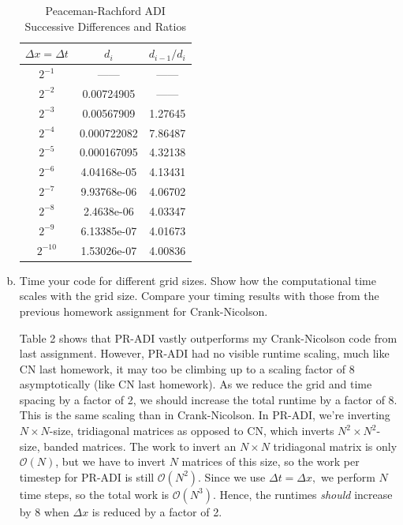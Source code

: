 \documentclass[12pt]{article}
\begin{document}
\begin{enumerate}[(a)]
\begin{table}[H]
\caption{Peaceman-Rachford ADI Successive Differences and Ratios}
\centering\begin{tabular}{||c|cc||}
\hline \hline
   $\Delta x = \Delta t$ &  $d_i$ &   $d_{i-1}/d_{i}$ \\
\hline \hline
                $2^{-1}$      &            ------       &        ------   \\
                $2^{-2}$    &              0.00724905  &       ------   \\
                $2^{-3}$    &     0.00567909  &             1.27645 \\
                $2^{-4}$     &         0.000722082 &    7.86487 \\
                $2^{-5}$      &       0.000167095 &             4.32138 \\
                $2^{-6}$       &       4.04168e-05 &             4.13431 \\
                $2^{-7}$        &       9.93768e-06 &             4.06702 \\
                $2^{-8}$         &     2.4638e-06  &             4.03347 \\
                $2^{-9}$          &     6.13385e-07 &             4.01673 \\
                $2^{-10}$          &     1.53026e-07 &             4.00836 \\
\hline \hline
\end{tabular}
\end{table}


\item Time your code for different grid sizes. Show how the computational time scales with the grid size. Compare your timing results with those from the previous homework assignment for Crank-Nicolson.

Table 2 shows that PR-ADI vastly outperforms my Crank-Nicolson code from last assignment.  However, PR-ADI had no visible runtime scaling, much like CN last homework, it may too be climbing up to a scaling factor of 8 asymptotically (like CN last homework).  As we reduce the grid and time spacing by a factor of 2, we should increase the total runtime by a factor of 8.  This is the same scaling than in Crank-Nicolson.  In PR-ADI, we're inverting $N\times N$-size, tridiagonal matrices as opposed to CN, which inverts $N^2\times N^2$-size, banded matrices.  The work to invert an $N\times N$ tridiagonal matrix is only $\mathcal{O}(N)$, but we have to invert $N$ matrices of this size, so the work per timestep for PR-ADI is still $\mathcal{O}(N^2)$.  Since we use $\Delta t = \Delta x,$ we perform $N$ time steps, so the total work is $\mathcal{O}(N^3)$.  Hence, the runtimes \emph{should} increase by 8 when $\Delta x$ is reduced by a factor of 2.


\end{enumerate}
\end{document}
